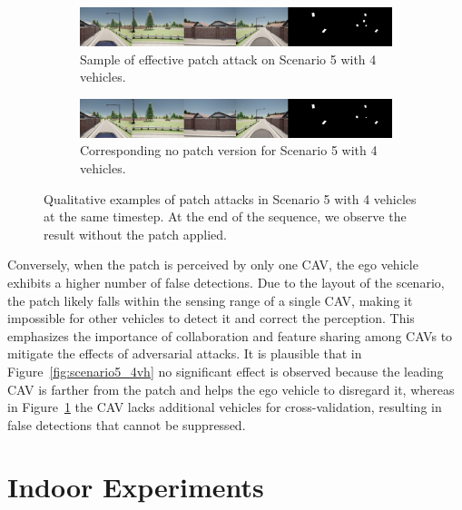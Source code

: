 \begin{figure}[tph]
    \centering

    \begin{subfigure}[b]{1\textwidth}
        \centering
        \includegraphics[width=\textwidth]{figures/results/scenario5.png}
        \caption{Sample of effective patch attack on Scenario 5 with 4 vehicles.}
        \label{fig:scenario5_4vh_effect}
    \end{subfigure}
    \vspace{0.5cm}

    \begin{subfigure}[b]{1\textwidth}
        \centering
        \includegraphics[width=\textwidth]{figures/results/scenario5gt.png}
        \caption{Corresponding no patch version for Scenario 5 with 4 vehicles.}
        \label{fig:scenario5_gt4vh_effect}
    \end{subfigure}
    \caption{
        Qualitative examples of patch attacks in Scenario 5 with 4 vehicles at the same timestep.
        At the end of the sequence, we observe the result without the patch applied.
    }
    \label{fig:scenario5_4vh_v2}
\end{figure}

Conversely, when the patch is perceived by only one CAV, the ego vehicle exhibits a higher number of false detections.
Due to the layout of the scenario, the patch likely falls within the sensing range of a single CAV, making it impossible for other vehicles to detect it and correct the perception.
This emphasizes the importance of collaboration and feature sharing among CAVs to mitigate the effects of adversarial attacks.
It is plausible that in Figure~\ref{fig:scenario5_4vh} no significant effect is observed because the leading CAV is farther from the patch and helps the ego vehicle to disregard it, whereas in Figure~\ref{fig:scenario5_4vh_effect} the CAV lacks additional vehicles for cross-validation, resulting in false detections that cannot be suppressed.

\section{Indoor Experiments}

